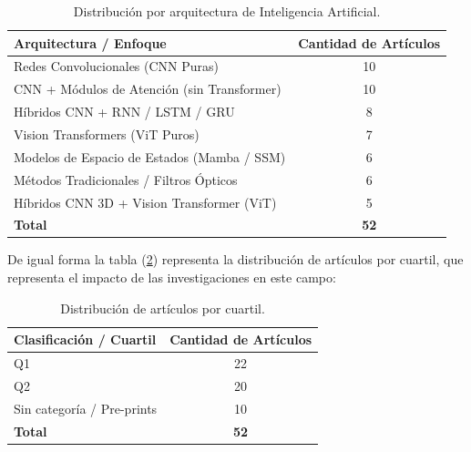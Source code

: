 \begin{table}[htbp]
    \centering
    \caption{Distribución por arquitectura de Inteligencia Artificial.}
    \label{tab:distribucion_modelos}
    \begin{tabular}{|l|c|}
        \hline
        \textbf{Arquitectura / Enfoque} & \textbf{Cantidad de Artículos} \\ \hline
        Redes Convolucionales (CNN Puras)               & 10                             \\ \hline
        CNN + Módulos de Atención (sin Transformer)     & 10                             \\ \hline
        Híbridos CNN + RNN / LSTM / GRU                 & 8                              \\ \hline
        Vision Transformers (ViT Puros)                 & 7                              \\ \hline
        Modelos de Espacio de Estados (Mamba / SSM)     & 6                              \\ \hline
        Métodos Tradicionales / Filtros Ópticos         & 6                              \\ \hline
        Híbridos CNN 3D + Vision Transformer (ViT)      & 5                             \\ \hline
        \textbf{Total}                        & \textbf{52}                    \\ \hline
    \end{tabular}
\end{table}

\newpage
De igual forma la tabla (\ref{tab:distribucion_q}) representa la distribución de artículos por cuartil, que representa el impacto de las investigaciones en este campo:

\begin{table}[htbp]
    \centering
    \caption{Distribución de artículos por cuartil.}
    \label{tab:distribucion_q}
    \begin{tabular}{|l|c|}
        \hline
        \textbf{Clasificación / Cuartil} & \textbf{Cantidad de Artículos} \\ \hline
        Q1                               & 22                             \\ \hline
        Q2                               & 20                             \\ \hline
        Sin categoría / Pre-prints       & 10                             \\ \hline
        \textbf{Total}                   & \textbf{52}                    \\ \hline
    \end{tabular}
\end{table}

